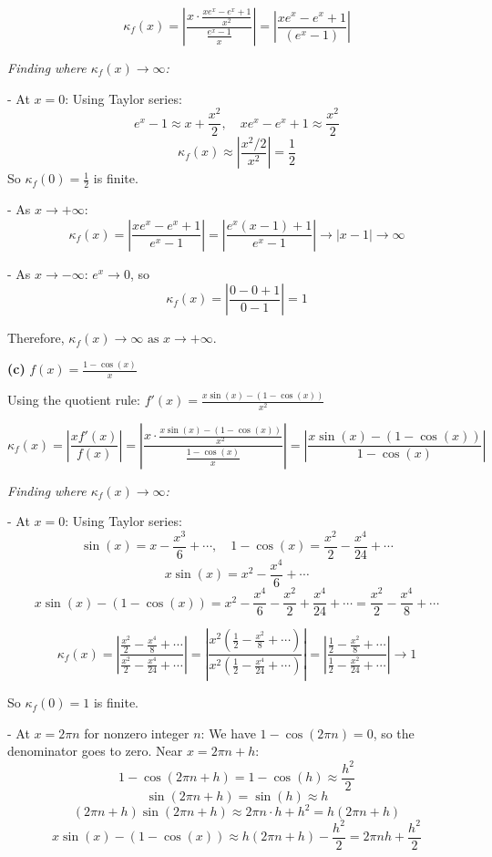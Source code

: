 \documentclass[reqno, answers]{exam}
\begin{document}
\begin{enumerate}
\begin{solution}
$$\kappa_f(x) = \left|\frac{x \cdot \frac{xe^x - e^x + 1}{x^2}}{\frac{e^x - 1}{x}}\right| = \left|\frac{xe^x - e^x + 1}{(e^x - 1)}\right|$$

\textit{Finding where $\kappa_f(x) \to \infty$:}

- At $x = 0$: Using Taylor series:
$$e^x - 1 \approx x + \frac{x^2}{2}, \quad xe^x - e^x + 1 \approx \frac{x^2}{2}$$
$$\kappa_f(x) \approx \left|\frac{x^2/2}{x^2}\right| = \frac{1}{2}$$
So $\kappa_f(0) = \frac{1}{2}$ is finite.


- As $x \to +\infty$: 
$$\kappa_f(x) = \left|\frac{xe^x - e^x + 1}{e^x - 1}\right| = \left|\frac{e^x(x - 1) + 1}{e^x - 1}\right| \to |x - 1| \to \infty$$

- As $x \to -\infty$: $e^x \to 0$, so 
$$\kappa_f(x) = \left|\frac{0 - 0 + 1}{0 - 1}\right| = 1$$

Therefore, $\boxed{\kappa_f(x) \to \infty \text{ as } x \to +\infty}$.

\textbf{(c)} $f(x) = \frac{1 - \cos(x)}{x}$

Using the quotient rule: $f'(x) = \frac{x\sin(x) - (1-\cos(x))}{x^2}$

$$\kappa_f(x) = \left|\frac{xf'(x)}{f(x)}\right| = \left|\frac{x \cdot \frac{x\sin(x) - (1-\cos(x))}{x^2}}{\frac{1-\cos(x)}{x}}\right| = \left|\frac{x\sin(x) - (1-\cos(x))}{1-\cos(x)}\right|$$

\textit{Finding where $\kappa_f(x) \to \infty$:}

- At $x = 0$: Using Taylor series:
$$\sin(x) = x - \frac{x^3}{6} + \cdots, \quad 1 - \cos(x) = \frac{x^2}{2} - \frac{x^4}{24} + \cdots$$
$$x\sin(x) = x^2 - \frac{x^4}{6} + \cdots$$
$$x\sin(x) - (1-\cos(x)) = x^2 - \frac{x^4}{6} - \frac{x^2}{2} + \frac{x^4}{24} + \cdots = \frac{x^2}{2} - \frac{x^4}{8} + \cdots$$

$$\kappa_f(x) = \left|\frac{\frac{x^2}{2} - \frac{x^4}{8} + \cdots}{\frac{x^2}{2} - \frac{x^4}{24} + \cdots}\right| = \left|\frac{x^2(\frac{1}{2} - \frac{x^2}{8} + \cdots)}{x^2(\frac{1}{2} - \frac{x^4}{24} + \cdots)}\right| = \left|\frac{\frac{1}{2} - \frac{x^2}{8} + \cdots}{\frac{1}{2} - \frac{x^2}{24} + \cdots}\right| \to 1$$

So $\kappa_f(0) = 1$ is finite.

- At $x = 2\pi n$ for nonzero integer $n$: We have $1 - \cos(2\pi n) = 0$, so the denominator goes to zero. Near $x = 2\pi n + h$:
$$1 - \cos(2\pi n + h) = 1 - \cos(h) \approx \frac{h^2}{2}$$
$$\sin(2\pi n + h) = \sin(h) \approx h$$
$$(2\pi n + h)\sin(2\pi n + h) \approx 2\pi n \cdot h + h^2 = h(2\pi n + h)$$
$$x\sin(x) - (1-\cos(x)) \approx h(2\pi n + h) - \frac{h^2}{2} = 2\pi nh + \frac{h^2}{2}$$


\end{solution}
\end{enumerate}
\end{document}
